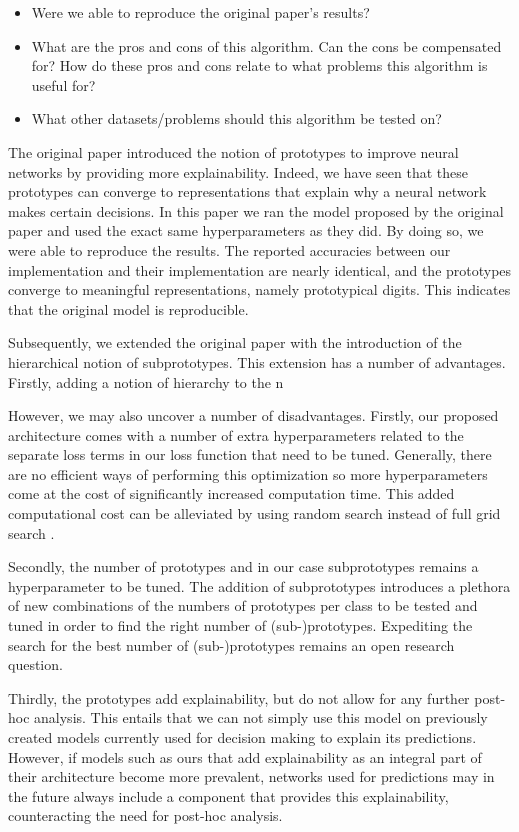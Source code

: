 \begin{itemize}
    \item Were we able to reproduce the original paper's results?
    \item What are the pros and cons of this algorithm. Can the cons be compensated for? How do these pros and cons relate to what problems this algorithm is useful for?
    \item What other datasets/problems should this algorithm be tested on?
\end{itemize}

The original paper \cite{li2018deep} introduced the notion of prototypes to improve neural networks by providing more explainability. Indeed, we have seen that these prototypes can converge to representations that explain why a neural network makes certain decisions. In this paper we ran the model proposed by the original paper and used the exact same hyperparameters as they did. By doing so, we were able to reproduce the results. The reported accuracies between our implementation and their implementation are nearly identical, and the prototypes converge to meaningful representations, namely prototypical digits. This indicates that the original model is reproducible. 

Subsequently, we extended the original paper with the introduction of the hierarchical notion of subprototypes. This extension has a number of advantages. Firstly, adding a notion of hierarchy to the n

However, we may also uncover a number of disadvantages. Firstly, our proposed architecture comes with a number of extra hyperparameters related to the separate loss terms in our loss function that need to be tuned. Generally, there are no efficient ways of performing this optimization \cite{paramoptimization} so more hyperparameters come at the cost of significantly increased computation time. This added computational cost can be alleviated by using random search instead of full grid search \cite{paramoptimization}.

Secondly, the number of prototypes and in our case subprototypes remains a hyperparameter to be tuned. The addition of subprototypes introduces a plethora of new combinations of the numbers of prototypes per class to be tested and tuned in order to find the right number of (sub-)prototypes. Expediting the search for the best number of (sub-)prototypes remains an open research question.

Thirdly, the prototypes add explainability, but do not allow for any further post-hoc analysis. This entails that we can not simply use this model on previously created models currently used for decision making to explain its predictions. However, if models such as ours that add explainability as an integral part of their architecture become more prevalent, networks used for predictions may in the future always include a component that provides this explainability, counteracting the need for post-hoc analysis.

